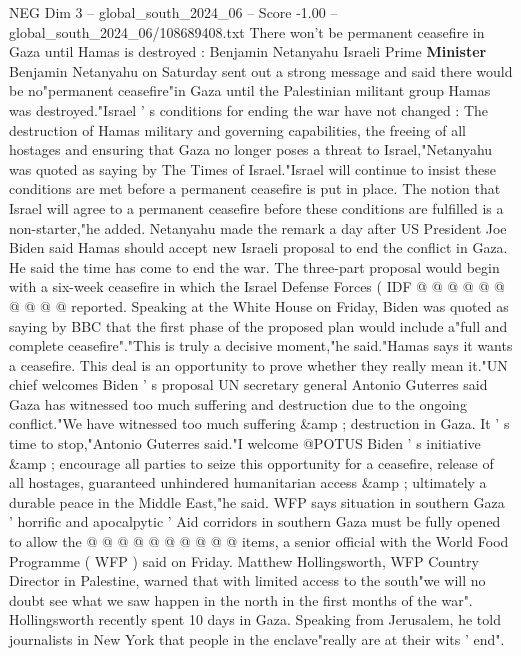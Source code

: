 \begin{textsample}{NEG Dim 3 – global\_south\_2024\_06 – Score -1.00 – global\_south\_2024\_06/108689408.txt}  \label{ex:f3_neg_112}
There won't be permanent ceasefire in Gaza until Hamas is destroyed : Benjamin Netanyahu Israeli Prime \textbf{Minister} Benjamin Netanyahu on Saturday sent out a strong message and said there would be no"permanent ceasefire"in Gaza until the Palestinian militant group Hamas was destroyed."Israel ' s conditions for ending the war have not changed : The destruction of Hamas military and governing capabilities, the freeing of all hostages and ensuring that Gaza no longer poses a threat to Israel,"Netanyahu was quoted as saying by The Times of Israel."Israel will continue to insist these conditions are met before a permanent ceasefire is put in place.
The notion that Israel will agree to a permanent ceasefire before these conditions are fulfilled is a non-starter,"he added.
Netanyahu made the remark a day after US President Joe Biden said Hamas should accept new Israeli proposal to end the conflict in Gaza.
He said the time has come to end the war.
The three-part proposal would begin with a six-week ceasefire in which the Israel Defense Forces ( IDF @ @ @ @ @ @ @ @ @ @ reported.
Speaking at the White House on Friday, Biden was quoted as saying by BBC that the first phase of the proposed plan would include a"full and complete ceasefire"."This is truly a decisive moment,"he said."Hamas says it wants a ceasefire.
This deal is an opportunity to prove whether they really mean it."UN chief welcomes Biden ' s proposal UN secretary general Antonio Guterres said Gaza has witnessed too much suffering and destruction due to the ongoing conflict."We have witnessed too much suffering \&amp ; destruction in Gaza.
It ' s time to stop,"Antonio Guterres said."I welcome @POTUS Biden ' s initiative \&amp ; encourage all parties to seize this opportunity for a ceasefire, release of all hostages, guaranteed unhindered humanitarian access \&amp ; ultimately a durable peace in the Middle East,"he said.
WFP says situation in southern Gaza ' horrific and apocalpytic ' Aid corridors in southern Gaza must be fully opened to allow the @ @ @ @ @ @ @ @ @ @ items, a senior official with the World Food Programme ( WFP ) said on Friday.
Matthew Hollingsworth, WFP Country Director in Palestine, warned that with limited access to the south"we will no doubt see what we saw happen in the north in the first months of the war".
Hollingsworth recently spent 10 days in Gaza.
Speaking from Jerusalem, he told journalists in New York that people in the enclave"really are at their wits ' end".

\end{textsample}
